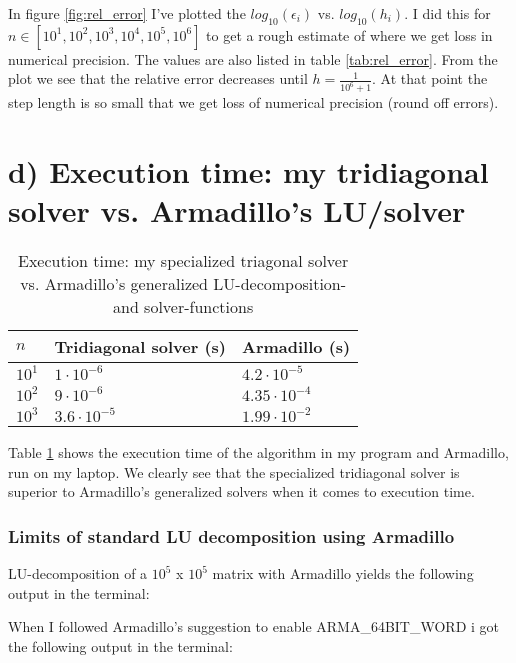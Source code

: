 \documentclass[norsk,a4paper,12pt]{article}
\begin{document}
In figure \ref{fig:rel_error} I've plotted the $log_{10}(\epsilon_i)$ vs. $log_{10}(h_i)$. I did this for $n \in [10^1, 10^2,10^3,10^4,10^5,10^6]$ to get a rough estimate of where we get loss in numerical precision. The values are also listed in table \ref{tab:rel_error}. From the plot we see that the relative error decreases until $h = \frac{1}{10^6+1}$. At that point the step length is so small that we get loss of numerical precision (round off errors).



\section{d) Execution time: my tridiagonal solver vs. Armadillo's LU/solver}

\begin{table}[ht!]
	\caption{Execution time: my specialized triagonal solver vs. Armadillo's generalized LU-decomposition- and solver-functions}
    \begin{tabular}{|l|l|l|}
    \hline
    $n$     & Tridiagonal solver (s)  & Armadillo (s)  \\ \hline
    $10^1$ & $1 \cdot 10^{-6}$                & $4.2 \cdot 10^{-5}$      \\ \hline
    $10^2$ & $9 \cdot 10^{-6}$                & $4.35 \cdot 10^{-4}$      \\ \hline
    $10^3$ & $3.6 \cdot 10^{-5}$              & $1.99 \cdot 10^{-2}$      \\ \hline
    \end{tabular}
    \label{tab:exec_time}
\end{table}

Table \ref{tab:exec_time} shows the execution time of the algorithm in my program and Armadillo, run on my laptop. We clearly see that the specialized tridiagonal solver is superior to Armadillo's generalized solvers when it comes to execution time. 

\subsubsection*{Limits of standard LU decomposition using Armadillo}

LU-decomposition of a $10^5$ x $10^5$ matrix with Armadillo yields the following output in the terminal:


When I followed Armadillo's suggestion to enable ARMA\_64BIT\_WORD i got the following output in the terminal:

\end{document}
